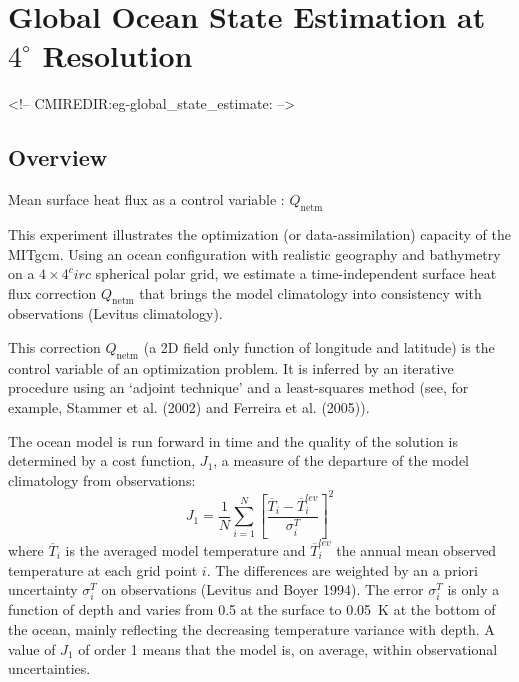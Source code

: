 
\section[Global Ocean State Estimation Example]{Global Ocean State Estimation at $4^\circ$ Resolution}
\label{www:tutorials}
\label{sect:eg-global_state_estimate}
\begin{rawhtml}
<!-- CMIREDIR:eg-global_state_estimate: -->
\end{rawhtml}

\subsection{Overview}

Mean surface heat flux as a  control variable : $Q_\mathrm{netm}$

This experiment illustrates the optimization (or data-assimilation) capacity
of the MITgcm. Using an ocean configuration with realistic geography and bathymetry on a
$4\times4^circ$ spherical polar grid, we estimate a time-independent surface heat flux correction
$Q_\mathrm{netm}$ that brings the model climatology into consistency with observations (Levitus
climatology).

This correction $Q_\mathrm{netm}$ (a 2D field only function of longitude and latitude) is
the control variable of an optimization problem. It is inferred by an iterative
procedure using an `adjoint technique' and a least-squares method (see, for example, 
Stammer et al. (2002) and Ferreira et al. (2005)).

The ocean model is run forward in time and the quality of the solution is
determined by a cost function, $J_1$, a measure of the departure of the model
climatology from observations:
\begin{equation}
J_1=\frac{1}{N}\sum_{i=1}^N \left[ \frac{\overline{T}_i-\overline{T}_i^{lev}}{\sigma_i^T}\right]^2
\end{equation}
where $\overline{T}_i$ is the averaged model temperature and $\overline{T}_i^{lev}$
the annual mean observed temperature at each grid point $i$. The differences
are weighted by an a priori uncertainty $\sigma_i^T$ on observations (Levitus
and Boyer 1994). The error $\sigma_i^T$ is only a function of depth and varies
from 0.5 at the surface to 0.05~K at the bottom of the ocean, mainly reflecting
the decreasing temperature variance with depth. A value of $J_1$ of order 1 means
that the model is, on average, within observational uncertainties.

